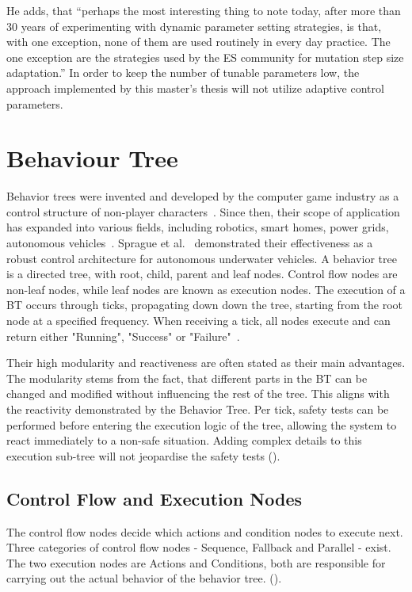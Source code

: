 He adds, that \enquote{perhaps the most interesting thing to note today, after more than 30 years of experimenting with dynamic parameter setting strategies, is that, with one exception, none of them are used routinely in every day practice. The one exception are the strategies used by the ES community for mutation step size adaptation.} In order to keep the number of tunable parameters low, the approach implemented by this master's thesis will not utilize adaptive control parameters.

\section{Behaviour Tree}
Behavior trees were invented and developed by the computer game industry as a control structure of non-player characters~\cite{collendanchise_behavior_2019}. Since then, their scope of application has expanded into various fields, including robotics, smart homes, power grids, autonomous vehicles~\cite{iovino_survey_2022}. Sprague et al.~\cite{sprague_improving_2018} demonstrated their effectiveness as a robust control architecture for autonomous underwater vehicles. A behavior tree is a directed tree, with root, child, parent and leaf nodes. Control flow nodes are non-leaf nodes, while leaf nodes are known as execution nodes. The execution of a BT occurs through ticks, propagating down down the tree, starting from the root node at a specified frequency. When receiving a tick, all nodes execute and can return either "Running", "Success" or "Failure"~\cite{collendanchise_behavior_2019}.

Their high modularity and reactiveness are often stated as their main advantages. The modularity stems from the fact, that different parts in the BT can be changed and modified without influencing the rest of the tree. This aligns with the reactivity demonstrated by the Behavior Tree. Per tick, safety tests can be performed before entering the execution logic of the tree, allowing the system to react immediately to a non-safe situation. Adding complex details to this execution sub-tree will not jeopardise the safety tests (\cite{sprague_improving_2018}).

\subsection{Control Flow and Execution Nodes}
The control flow nodes decide which actions and condition nodes to execute next. Three categories of control flow nodes - Sequence, Fallback and Parallel - exist. The two execution nodes are Actions and Conditions, both are responsible for carrying out the actual behavior of the behavior tree. (\cite{collendanchise_behavior_2019}).


